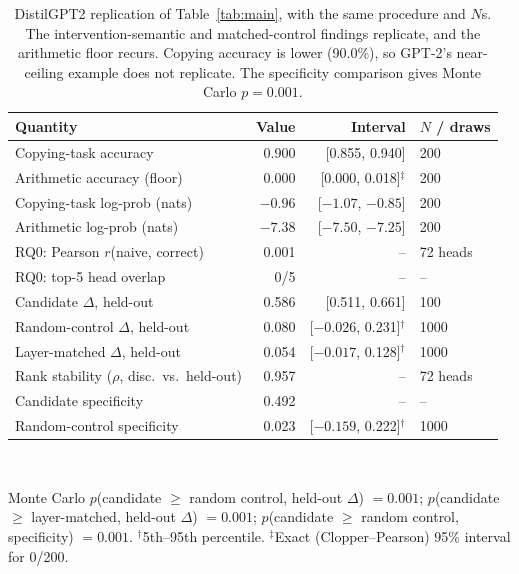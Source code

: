 \documentclass{article}
\begin{document}
\begin{table}[h]
  \caption{DistilGPT2 replication of Table~\ref{tab:main}, with the same
  procedure and $N$s. The intervention-semantic and matched-control
  findings replicate, and the arithmetic floor recurs. Copying accuracy
  is lower (90.0\%), so GPT-2's near-ceiling example does not replicate.
  The specificity comparison gives Monte Carlo $p=0.001$.}
  \label{tab:distilgpt2}
  \centering
  \small
  \begin{tabular}{lrrl}
    \toprule
    Quantity & Value & Interval & $N$ / draws \\
    \midrule
    Copying-task accuracy & 0.900 & [0.855, 0.940] & 200 \\
    Arithmetic accuracy (floor) & 0.000 & [0.000, 0.018]$^\ddagger$ & 200 \\
    Copying-task log-prob (nats) & $-0.96$ & [$-1.07$, $-0.85$] & 200 \\
    Arithmetic log-prob (nats) & $-7.38$ & [$-7.50$, $-7.25$] & 200 \\
    RQ0: Pearson $r$(naive, correct) & 0.001 & -- & 72 heads \\
    RQ0: top-5 head overlap & 0/5 & -- & -- \\
    Candidate $\Delta$, held-out & 0.586 & [0.511, 0.661] & 100 \\
    Random-control $\Delta$, held-out & 0.080 & [$-0.026$, 0.231]$^\dagger$ & 1000 \\
    Layer-matched $\Delta$, held-out & 0.054 & [$-0.017$, 0.128]$^\dagger$ & 1000 \\
    Rank stability ($\rho$, disc.\ vs.\ held-out) & 0.957 & -- & 72 heads \\
    Candidate specificity & 0.492 & -- & -- \\
    Random-control specificity & 0.023 & [$-0.159$, 0.222]$^\dagger$ & 1000 \\
    \bottomrule
  \end{tabular}
  \vspace{0.3em}
  \\
  \raggedright \footnotesize Monte Carlo $p$(candidate $\geq$ random control, held-out $\Delta$) $=0.001$; \quad
  $p$(candidate $\geq$ layer-matched, held-out $\Delta$) $=0.001$; \quad
  $p$(candidate $\geq$ random control, specificity) $=0.001$. $^\dagger$5th--95th percentile.
  $^\ddagger$Exact (Clopper--Pearson) 95\% interval for 0/200.
\end{table}
\end{document}
